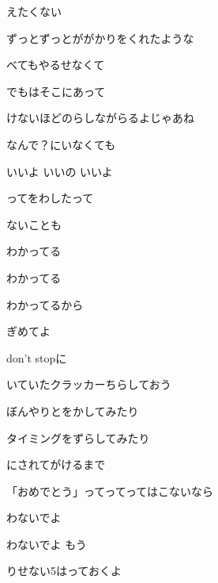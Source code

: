 \documentclass[a4paper,tate,twocolumn,12pt]{ltjtarticle}
\begin{document}
\begin{flushleft}
\begin{minipage}{\linewidth}
えたくない

ずっとずっとががかりをくれたような

べてもやるせなくて

でもはそこにあって

けないほどのらしながらるよじゃあね
\end{minipage}

\vspace{2em}

\noindent\begin{minipage}{\linewidth}
なんで？にいなくても

いいよ いいの いいよ

ってをわしたって

ないことも

わかってる

わかってる

わかってるから

ぎめてよ

don't stopに

いていたクラッカーちらしておう
\end{minipage}

\vspace{2em}

\noindent\begin{minipage}{\linewidth}
ぼんやりとをかしてみたり

タイミングをずらしてみたり

にされてがけるまで
\end{minipage}

\vspace{2em}

\noindent\begin{minipage}{\linewidth}
「おめでとう」ってってってはこないなら

わないでよ

わないでよ もう

りせない5はっておくよ
\end{minipage}

\vspace{2em}


\end{flushleft}
\end{document}

